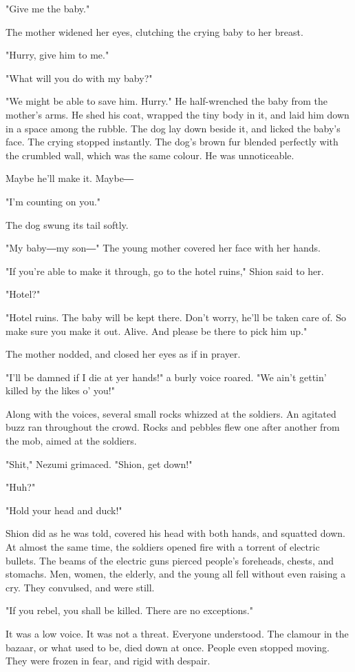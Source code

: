 "Give me the baby."

The mother widened her eyes, clutching the crying baby to her breast.

"Hurry, give him to me."

"What will you do with my baby?"

"We might be able to save him. Hurry." He half-wrenched the baby from
the mother's arms. He shed his coat, wrapped the tiny body in it, and
laid him down in a space among the rubble. The dog lay down beside it,
and licked the baby's face. The crying stopped instantly. The dog's
brown fur blended perfectly with the crumbled wall, which was the same
colour. He was unnoticeable.

Maybe he'll make it. Maybe―

"I'm counting on you."

The dog swung its tail softly.

"My baby―my son―" The young mother covered her face with her hands.

"If you're able to make it through, go to the hotel ruins," Shion said
to her.

"Hotel?"

"Hotel ruins. The baby will be kept there. Don't worry, he'll be taken
care of. So make sure you make it out. Alive. And please be there to
pick him up."

The mother nodded, and closed her eyes as if in prayer.

"I'll be damned if I die at yer hands!" a burly voice roared. "We ain't
gettin' killed by the likes o' you!"

Along with the voices, several small rocks whizzed at the soldiers. An
agitated buzz ran throughout the crowd. Rocks and pebbles flew one after
another from the mob, aimed at the soldiers.

"Shit," Nezumi grimaced. "Shion, get down!"

"Huh?"

"Hold your head and duck!"

Shion did as he was told, covered his head with both hands, and squatted
down. At almost the same time, the soldiers opened fire with a torrent
of electric bullets. The beams of the electric guns pierced people's
foreheads, chests, and stomachs. Men, women, the elderly, and the young
all fell without even raising a cry. They convulsed, and were still.

"If you rebel, you shall be killed. There are no exceptions."

It was a low voice. It was not a threat. Everyone understood. The
clamour in the bazaar, or what used to be, died down at once. People
even stopped moving. They were frozen in fear, and rigid with despair.

